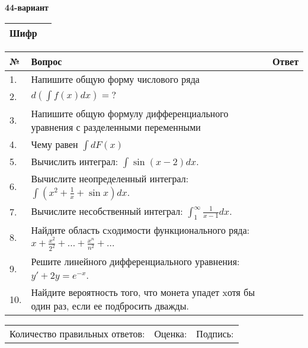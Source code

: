 \documentclass{article}
\begin{document}
  \egroup
  
  \newpage
  
  
  \textbf{44-вариант}\\
  
  \bgroup
  \def\arraystretch{1.6} %
  
  \begin{tabular}{|m{5.7cm}|m{9.5cm}|}
  \hline
  Шифр & \\
  \hline
  \end{tabular}
  
  \vspace{1cm}
  
  \begin{tabular}{|m{0.7cm}|m{10cm}|m{4cm}|}
  \hline
  № & Вопрос & Ответ \\
  \hline
  1. & Напишите общую форму числового ряда &  \\
  \hline
  2. & \(d\left( \int{f(x)dx} \right) = ?\) &  \\
  \hline
  3. & Напишите общую формулу дифференциального уравнения с разделенными переменными &  \\
  \hline
  4. & Чему равен \(\int{dF(x)}\) &  \\
  \hline
  5. & Вычислить интеграл: \(\int{\sin(x - 2)dx}\). &  \\
  \hline
  6. & Вычислите неопределенный интеграл: \(\int{\left( x^{2} + \frac{1}{x} + \sin x \right)dx}\). &  \\
  \hline
  7. & Вычислите несобственный интеграл: \(\int_{1}^{\infty}{\frac{1}{x - 1}dx}\). &  \\
  \hline
  8. & Найдите область сxодимости функционального ряда: \(x + \frac{x^{2}}{2^{2}} + ... + \frac{x^{n}}{n^{2}} + ...\) &  \\
  \hline
  9. & Решите линейного дифференциального уравнения: \(y' + 2y = e^{- x}\). &  \\
  \hline
  10. & Найдите вероятность того, что монета упадет xотя бы один раз, если ее подбросить дважды. &  \\
  \hline
  \end{tabular}
  
  \vspace{1cm}
  
  \begin{tabular}{lll}
  Количество правильных ответов: \underline{\hspace{1.5cm}} & 
  Оценка: \underline{\hspace{1.5cm}} & 
  Подпись: \underline{\hspace{2cm}} \\
  \end{tabular}
  
\end{document}
